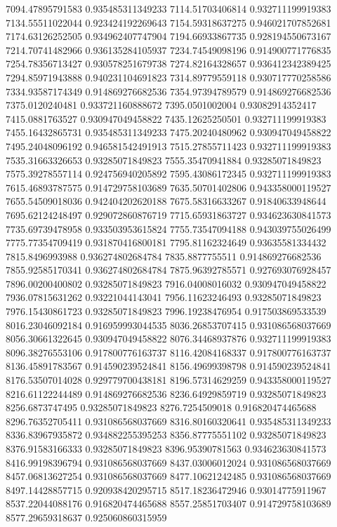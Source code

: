 {7094.47895791583 0.935485311349233
7114.51703406814 0.932711199919383
7134.55511022044 0.923424192269643
7154.59318637275 0.946021707852681
7174.63126252505 0.934962407747904
7194.66933867735 0.928194550673167
7214.70741482966 0.936135284105937
7234.74549098196 0.914900771776835
7254.78356713427 0.930578251679738
7274.82164328657 0.936412342389425
7294.85971943888 0.940231104691823
7314.89779559118 0.930717770258586
7334.93587174349 0.914869276682536
7354.97394789579 0.914869276682536
7375.0120240481 0.933721160888672
7395.0501002004 0.93082914352417
7415.0881763527 0.930947049458822
7435.12625250501 0.932711199919383
7455.16432865731 0.935485311349233
7475.20240480962 0.930947049458822
7495.24048096192 0.946581542491913
7515.27855711423 0.932711199919383
7535.31663326653 0.93285071849823
7555.35470941884 0.93285071849823
7575.39278557114 0.924756940205892
7595.43086172345 0.932711199919383
7615.46893787575 0.914729758103689
7635.50701402806 0.943358000119527
7655.54509018036 0.942404202620188
7675.58316633267 0.91840633948644
7695.62124248497 0.929072860876719
7715.65931863727 0.934623630841573
7735.69739478958 0.933503953615824
7755.73547094188 0.943039755026499
7775.77354709419 0.931870416800181
7795.81162324649 0.93635581334432
7815.8496993988 0.936274802684784
7835.8877755511 0.914869276682536
7855.92585170341 0.936274802684784
7875.96392785571 0.927693076928457
7896.00200400802 0.93285071849823
7916.04008016032 0.930947049458822
7936.07815631262 0.93221044143041
7956.11623246493 0.93285071849823
7976.15430861723 0.93285071849823
7996.19238476954 0.917503869533539
8016.23046092184 0.916959993044535
8036.26853707415 0.931086568037669
8056.30661322645 0.930947049458822
8076.34468937876 0.932711199919383
8096.38276553106 0.917800776163737
8116.42084168337 0.917800776163737
8136.45891783567 0.914590239524841
8156.49699398798 0.914590239524841
8176.53507014028 0.929779700438181
8196.57314629259 0.943358000119527
8216.61122244489 0.914869276682536
8236.64929859719 0.93285071849823
8256.6873747495 0.93285071849823
8276.7254509018 0.916820474465688
8296.76352705411 0.931086568037669
8316.80160320641 0.935485311349233
8336.83967935872 0.934882255395253
8356.87775551102 0.93285071849823
8376.91583166333 0.93285071849823
8396.95390781563 0.934623630841573
8416.99198396794 0.931086568037669
8437.03006012024 0.931086568037669
8457.06813627254 0.931086568037669
8477.10621242485 0.931086568037669
8497.14428857715 0.920938420295715
8517.18236472946 0.93014775911967
8537.22044088176 0.916820474465688
8557.25851703407 0.914729758103689
8577.29659318637 0.925060860315959
}
